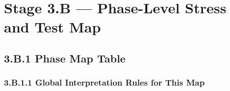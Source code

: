 \documentclass[10pt]{article}
\begin{document}
\section*{Stage 3.B — Phase-Level Stress and Test Map}
{}

\subsection*{3.B.1 Phase Map Table}
{}

\subsubsection*{3.B.1.1 Global Interpretation Rules for This Map}
\end{document}
